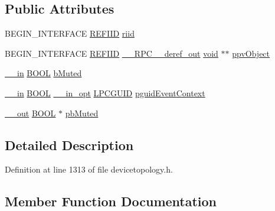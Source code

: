 \subsection*{Public Attributes}
\begin{DoxyCompactItemize}
\item 
B\+E\+G\+I\+N\+\_\+\+I\+N\+T\+E\+R\+F\+A\+CE \hyperlink{px__win__ds_8c_a80ec49c8ae61e234197d5071d2df497d}{R\+E\+F\+I\+ID} \hyperlink{struct_i_audio_mute_vtbl_ab49d6ef38a02d4f0b3896f42b61bf6ae}{riid}
\item 
B\+E\+G\+I\+N\+\_\+\+I\+N\+T\+E\+R\+F\+A\+CE \hyperlink{px__win__ds_8c_a80ec49c8ae61e234197d5071d2df497d}{R\+E\+F\+I\+ID} \hyperlink{rpcsal_8h_a23bc188526f10656f9c79d950f6c3192}{\+\_\+\+\_\+\+R\+P\+C\+\_\+\+\_\+deref\+\_\+out} \hyperlink{sound_8c_ae35f5844602719cf66324f4de2a658b3}{void} $\ast$$\ast$ \hyperlink{struct_i_audio_mute_vtbl_a14258911aafdb755bd1dca317a4ce8b8}{ppv\+Object}
\item 
\hyperlink{sal_8h_a3f6b8655e1aa9dfc15a9029f0343009e}{\+\_\+\+\_\+in} \hyperlink{nfilterkit_8h_a3be13892ae7076009afcf121347dd319}{B\+O\+OL} \hyperlink{struct_i_audio_mute_vtbl_ad7ecb7347a269313b6441dad79d74bf2}{b\+Muted}
\item 
\hyperlink{sal_8h_a3f6b8655e1aa9dfc15a9029f0343009e}{\+\_\+\+\_\+in} \hyperlink{nfilterkit_8h_a3be13892ae7076009afcf121347dd319}{B\+O\+OL} \hyperlink{sal_8h_a9c2d0f2980e51b51bb405ee2a31a3353}{\+\_\+\+\_\+in\+\_\+opt} \hyperlink{pa__win__wasapi_8c_a9c061ab1f26db8746b3dab38991f48a0}{L\+P\+C\+G\+U\+ID} \hyperlink{struct_i_audio_mute_vtbl_aba252a6a1ba148df2a670a3e6bd46dae}{pguid\+Event\+Context}
\item 
\hyperlink{sal_8h_abb4c3c1135aab6c47cff22e7c16efb74}{\+\_\+\+\_\+out} \hyperlink{nfilterkit_8h_a3be13892ae7076009afcf121347dd319}{B\+O\+OL} $\ast$ \hyperlink{struct_i_audio_mute_vtbl_a27e2e0f40a70e474c6ea0c7163c114a6}{pb\+Muted}
\end{DoxyCompactItemize}


\subsection{Detailed Description}


Definition at line 1313 of file devicetopology.\+h.



\subsection{Member Function Documentation}
